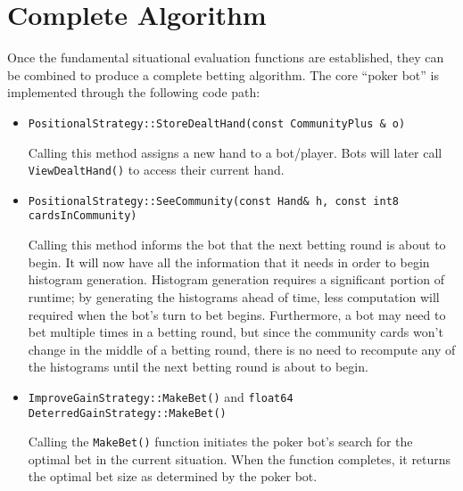 
\clearpage




\chapter{Complete Algorithm}
\label{sec:CompleteAlgorithm}

Once the fundamental situational evaluation functions are established, they can be combined to produce a complete betting algorithm.
The core ``poker bot'' is implemented through the following code path:
\begin{itemize}
\singlespacing
\item \texttt{PositionalStrategy::StoreDealtHand(const CommunityPlus \& o)}

Calling this method assigns a new hand to a bot/player.
Bots will later call \texttt{ViewDealtHand()} to access their current hand.

\item \texttt{PositionalStrategy::SeeCommunity(const Hand\& h, const int8 cardsInCommunity)}

Calling this method informs the bot that the next betting round is about to begin.
It will now have all the information that it needs in order to begin histogram generation.
Histogram generation requires a significant portion of runtime; by generating the histograms ahead of time, less computation will required when the bot's turn to bet begins.
Furthermore, a bot may need to bet multiple times in a betting round, but since the community cards won't change in the middle of a betting round, there is no need to recompute any of the histograms until the next betting round is about to begin.

\item \texttt{ImproveGainStrategy::MakeBet()} and \texttt{float64 DeterredGainStrategy::MakeBet()}

Calling the \texttt{MakeBet()} function initiates the poker bot's search for the optimal bet in the current situation.
When the function completes, it returns the optimal bet size as determined by the poker bot.

\end{itemize}

\clearpage
